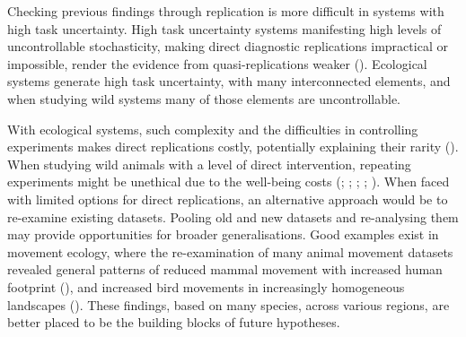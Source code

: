 \documentclass[10pt,a4paper]{article}
\begin{document}
Checking previous findings through replication is more difficult in systems with high task uncertainty.
High task uncertainty systems manifesting high levels of uncontrollable stochasticity, making direct diagnostic replications impractical or impossible, render the evidence from quasi-replications weaker ().
Ecological systems generate high task uncertainty, with many interconnected elements, and when studying wild systems many of those elements are uncontrollable.

With ecological systems, such complexity and the difficulties in controlling experiments makes direct replications costly, potentially explaining their rarity ().
When studying wild animals with a level of direct intervention, repeating experiments might be unethical due to the well-being costs (; ; ; ; ).
When faced with limited options for direct replications, an alternative approach would be to re-examine existing datasets.
Pooling old and new datasets and re-analysing them may provide opportunities for broader generalisations.
Good examples exist in movement ecology, where the re-examination of many animal movement datasets revealed general patterns of reduced mammal movement with increased human footprint (), and increased bird movements in increasingly homogeneous landscapes ().
These findings, based on many species, across various regions, are better placed to be the building blocks of future hypotheses.
\end{document}
